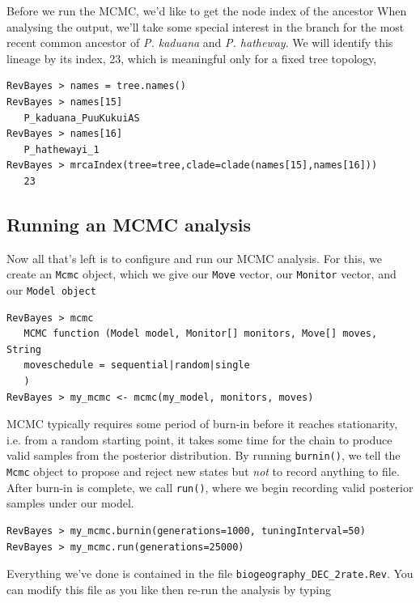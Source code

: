 Before we run the MCMC, we'd like to get the node index of the ancestor 
When analysing the output, we'll take some special interest in the branch for the most recent common ancestor of {\it P. kaduana} and {\it P. hatheway}.
We will identify this lineage by its index, 23, which is meaningful only for a fixed tree topology,
\begin{snugshade}
\begin{lstlisting}
RevBayes > names = tree.names()
RevBayes > names[15]
   P_kaduana_PuuKukuiAS
RevBayes > names[16]
   P_hathewayi_1
RevBayes > mrcaIndex(tree=tree,clade=clade(names[15],names[16]))
   23
\end{lstlisting}
\end{snugshade}


\subsection{Running an MCMC analysis}

Now all that's left is to configure and run our MCMC analysis.
For this, we create an {\tt Mcmc} object, which we give our {\tt Move} vector, our {\tt Monitor} vector, and our {\tt Model object}

\begin{snugshade}
\begin{lstlisting}
RevBayes > mcmc
   MCMC function (Model model, Monitor[] monitors, Move[] moves, String
   moveschedule = sequential|random|single
   )
RevBayes > my_mcmc <- mcmc(my_model, monitors, moves)
\end{lstlisting}
\end{snugshade}

MCMC typically requires some period of burn-in before it reaches stationarity, i.e. from a random starting point, it takes some time for the chain to produce valid samples from the posterior distribution.
By running {\tt burnin()}, we tell the {\tt Mcmc} object to propose and reject new states but {\it not} to record anything to file.
After burn-in is complete, we call {\tt run()}, where we begin recording valid posterior samples under our model.

\begin{snugshade}
\begin{lstlisting}
RevBayes > my_mcmc.burnin(generations=1000, tuningInterval=50)
RevBayes > my_mcmc.run(generations=25000)
\end{lstlisting}
\end{snugshade}

Everything we've done is contained in the file {\tt biogeography\_DEC\_2rate.Rev}.
You can modify this file as you like then re-run the analysis by typing

